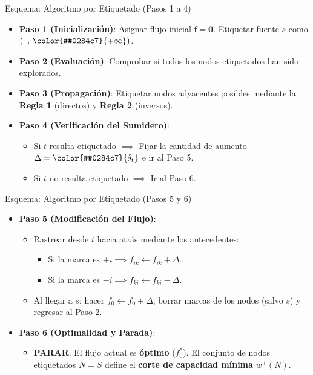 \documentclass[
  ignorenonframetext,
]{beamer}
\providecommand{\tightlist}{%
  \setlength{\itemsep}{0pt}\setlength{\parskip}{0pt}}
\begin{document}
\begin{frame}{Esquema: Algoritmo por Etiquetado (Pasos 1 a 4)}
\label{esquema-algoritmo-por-etiquetado-pasos-1-a-4}
\begin{itemize}
\tightlist
\item
  \textbf{Paso 1 (Inicialización)}: Asignar flujo inicial
  \(\mathbf{f} = \mathbf{0}\). Etiquetar fuente \(s\) como
  \((\text{–}, \, \color{#0284c7}{+\infty})\).
\item
  \textbf{Paso 2 (Evaluación)}: Comprobar si todos los nodos etiquetados
  han sido explorados.
\item
  \textbf{Paso 3 (Propagación)}: Etiquetar nodos adyacentes posibles
  mediante la \textbf{Regla 1} (directos) y \textbf{Regla 2} (inversos).
\item
  \textbf{Paso 4 (Verificación del Sumidero)}:

  \begin{itemize}
  \tightlist
  \item
    Si \(t\) resulta etiquetado \(\implies\) Fijar la cantidad de
    aumento \(\Delta = \color{#0284c7}{\delta_t}\) e ir al Paso 5.
  \item
    Si \(t\) no resulta etiquetado \(\implies\) Ir al Paso 6.
  \end{itemize}
\end{itemize}
\end{frame}

\begin{frame}{Esquema: Algoritmo por Etiquetado (Pasos 5 y 6)}
\label{esquema-algoritmo-por-etiquetado-pasos-5-y-6}
\begin{itemize}
\tightlist
\item
  \textbf{Paso 5 (Modificación del Flujo)}:

  \begin{itemize}
  \tightlist
  \item
    Rastrear desde \(t\) hacia atrás mediante los antecedentes:

    \begin{itemize}
    \tightlist
    \item
      Si la marca es \(+i \implies f_{ik} \leftarrow f_{ik} + \Delta\).
    \item
      Si la marca es \(-i \implies f_{ki} \leftarrow f_{ki} - \Delta\).
    \end{itemize}
  \item
    Al llegar a \(s\): hacer \(f_0 \leftarrow f_0 + \Delta\), borrar
    marcas de los nodos (salvo \(s\)) y regresar al Paso 2.
  \end{itemize}
\item
  \textbf{Paso 6 (Optimalidad y Parada)}:

  \begin{itemize}
  \tightlist
  \item
    \textbf{PARAR}. El flujo actual es \textbf{óptimo} (\(f_0^*\)). El
    conjunto de nodos etiquetados \(N = S\) define el \textbf{corte de
    capacidad mínima} \(w^+(N)\).
  \end{itemize}
\end{itemize}
\end{frame}
\end{document}
